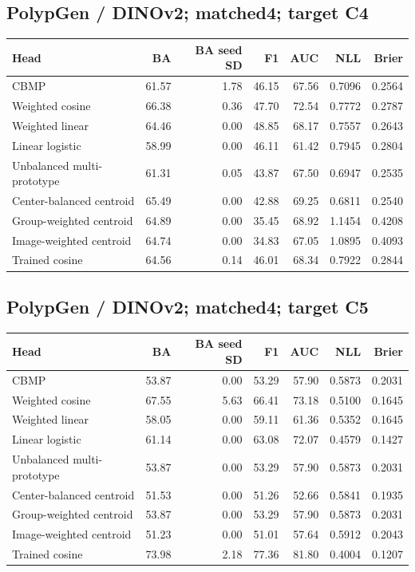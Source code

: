 \subsection*{PolypGen / DINOv2; matched4; target C4}
\begingroup\small\setlength{\tabcolsep}{3pt}
\begin{longtable}{lrrrrrr}
\toprule Head & BA & BA seed SD & F1 & AUC & NLL & Brier \\
\midrule
CBMP & 61.57 & 1.78 & 46.15 & 67.56 & 0.7096 & 0.2564 \\
Weighted cosine & 66.38 & 0.36 & 47.70 & 72.54 & 0.7772 & 0.2787 \\
Weighted linear & 64.46 & 0.00 & 48.85 & 68.17 & 0.7557 & 0.2643 \\
Linear logistic & 58.99 & 0.00 & 46.11 & 61.42 & 0.7945 & 0.2804 \\
Unbalanced multi-prototype & 61.31 & 0.05 & 43.87 & 67.50 & 0.6947 & 0.2535 \\
Center-balanced centroid & 65.49 & 0.00 & 42.88 & 69.25 & 0.6811 & 0.2540 \\
Group-weighted centroid & 64.89 & 0.00 & 35.45 & 68.92 & 1.1454 & 0.4208 \\
Image-weighted centroid & 64.74 & 0.00 & 34.83 & 67.05 & 1.0895 & 0.4093 \\
Trained cosine & 64.56 & 0.14 & 46.01 & 68.34 & 0.7922 & 0.2844 \\
\bottomrule
\end{longtable}
\endgroup
\subsection*{PolypGen / DINOv2; matched4; target C5}
\begingroup\small\setlength{\tabcolsep}{3pt}
\begin{longtable}{lrrrrrr}
\toprule Head & BA & BA seed SD & F1 & AUC & NLL & Brier \\
\midrule
CBMP & 53.87 & 0.00 & 53.29 & 57.90 & 0.5873 & 0.2031 \\
Weighted cosine & 67.55 & 5.63 & 66.41 & 73.18 & 0.5100 & 0.1645 \\
Weighted linear & 58.05 & 0.00 & 59.11 & 61.36 & 0.5352 & 0.1645 \\
Linear logistic & 61.14 & 0.00 & 63.08 & 72.07 & 0.4579 & 0.1427 \\
Unbalanced multi-prototype & 53.87 & 0.00 & 53.29 & 57.90 & 0.5873 & 0.2031 \\
Center-balanced centroid & 51.53 & 0.00 & 51.26 & 52.66 & 0.5841 & 0.1935 \\
Group-weighted centroid & 53.87 & 0.00 & 53.29 & 57.90 & 0.5873 & 0.2031 \\
Image-weighted centroid & 51.23 & 0.00 & 51.01 & 57.64 & 0.5912 & 0.2043 \\
Trained cosine & 73.98 & 2.18 & 77.36 & 81.80 & 0.4004 & 0.1207 \\
\bottomrule
\end{longtable}
\endgroup
